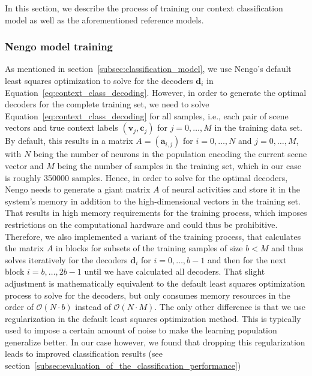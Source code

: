 In this section, we describe the process of training our context classification model as well as the aforementioned reference models.

\subsubsection{Nengo model training}%
\label{ssubsec:nengo_model_training}

As mentioned in section~\ref{subsec:classification_model}, we use \ac{Nengo}'s default least squares optimization to solve for the decoders $ \mathbf{d}_{i}$ in Equation~\eqref{eq:context_class_decoding}.
However, in order to generate the optimal decoders for the complete training set, we need to solve Equation~\eqref{eq:context_class_decoding} for all samples, i.e., each pair of scene vectors and true context labels  $ \left( \mathbf{v}_{j}, \mathbf{c}_j\right)$ for $j=0, \ldots, M$ in the training data set.
By default, this results in a matrix $A = \left( \mathbf{a}_{i,j}\right)$ for $i=0, \ldots, N$ and $j=0, \ldots, M$, with $N$ being the number of neurons in the population encoding the current scene vector and $M$ being the number of samples in the training set, which in our case is roughly \num{350000} samples.
Hence, in order to solve for the optimal decoders, \ac{Nengo} needs to generate a giant matrix $A$ of neural activities and store it in the system's memory in addition to the high-dimensional vectors in the training set.
That results in high memory requirements for the training process, which imposes restrictions on the computational hardware and could thus be prohibitive.
Therefore, we also implemented a variant of the training process, that calculates the matrix $A$ in blocks for subsets of the training samples of size $b < M$ and thus solves iteratively for the decoders $ \mathbf{d}_{i}$ for $i=0, \ldots, b-1$ and then for the next block $i=b, \ldots, 2b-1$ until we have calculated all decoders.
That slight adjustment is mathematically equivalent to the default least squares optimization process to solve for the decoders, but only consumes memory resources in the order of $ \mathcal{O}\left(N\cdot b\right)$ instead of $ \mathcal{O}\left(N \cdot M\right)$.
The only other difference is that we use regularization in the default least squares optimization method.
This is typically used to impose a certain amount of noise to make the learning population generalize better.
In our case however, we found that dropping this regularization leads to improved classification results (see section~\ref{subsec:evaluation_of_the_classification_performance})

